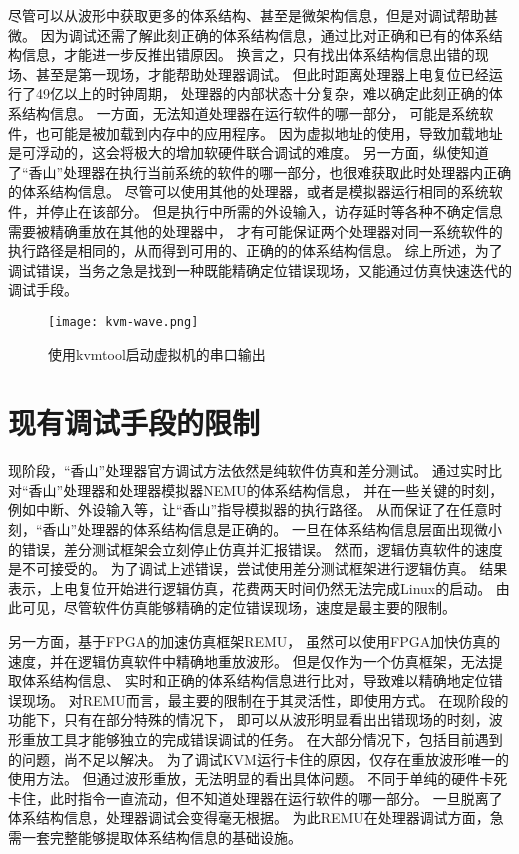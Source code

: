 尽管可以从波形中获取更多的体系结构、甚至是微架构信息，但是对调试帮助甚微。
因为调试还需了解此刻正确的体系结构信息，通过比对正确和已有的体系结构信息，才能进一步反推出错原因。
换言之，只有找出体系结构信息出错的现场、甚至是第一现场，才能帮助处理器调试。
但此时距离处理器上电复位已经运行了49亿以上的时钟周期，
处理器的内部状态十分复杂，难以确定此刻正确的体系结构信息。
一方面，无法知道处理器在运行软件的哪一部分，
可能是系统软件，也可能是被加载到内存中的应用程序。
因为虚拟地址的使用，导致加载地址是可浮动的，这会将极大的增加软硬件联合调试的难度。
另一方面，纵使知道了“香山”处理器在执行当前系统的软件的哪一部分，也很难获取此时处理器内正确的体系结构信息。
尽管可以使用其他的处理器，或者是模拟器运行相同的系统软件，并停止在该部分。
但是执行中所需的外设输入，访存延时等各种不确定信息需要被精确重放在其他的处理器中，
才有可能保证两个处理器对同一系统软件的执行路径是相同的，从而得到可用的、正确的的体系结构信息。
综上所述，为了调试错误，当务之急是找到一种既能精确定位错误现场，又能通过仿真快速迭代的调试手段。

\begin{figure}[htbp]
    \centering
    \texttt{[image: kvm-wave.png]}
    \caption{使用kvmtool启动虚拟机的串口输出}
    \label{fig:kvm-wave}
\end{figure}

\section{现有调试手段的限制}
现阶段，“香山”处理器官方调试方法依然是纯软件仿真和差分测试。
通过实时比对“香山”处理器和处理器模拟器NEMU的体系结构信息，
并在一些关键的时刻，例如中断、外设输入等，让“香山”指导模拟器的执行路径。
从而保证了在任意时刻，“香山”处理器的体系结构信息是正确的。
一旦在体系结构信息层面出现微小的错误，差分测试框架会立刻停止仿真并汇报错误。
然而，逻辑仿真软件的速度是不可接受的。
为了调试上述错误，尝试使用差分测试框架进行逻辑仿真。
结果表示，上电复位开始进行逻辑仿真，花费两天时间仍然无法完成Linux的启动。
由此可见，尽管软件仿真能够精确的定位错误现场，速度是最主要的限制。

另一方面，基于FPGA的加速仿真框架REMU，
虽然可以使用FPGA加快仿真的速度，并在逻辑仿真软件中精确地重放波形。
但是仅作为一个仿真框架，无法提取体系结构信息、
实时和正确的体系结构信息进行比对，导致难以精确地定位错误现场。
对REMU而言，最主要的限制在于其灵活性，即使用方式。
在现阶段的功能下，只有在部分特殊的情况下，
即可以从波形明显看出出错现场的时刻，波形重放工具才能够独立的完成错误调试的任务。
在大部分情况下，包括目前遇到的问题，尚不足以解决。
为了调试KVM运行卡住的原因，仅存在重放波形唯一的使用方法。
但通过波形重放，无法明显的看出具体问题。
不同于单纯的硬件卡死卡住，此时指令一直流动，但不知道处理器在运行软件的哪一部分。
一旦脱离了体系结构信息，处理器调试会变得毫无根据。
为此REMU在处理器调试方面，急需一套完整能够提取体系结构信息的基础设施。

